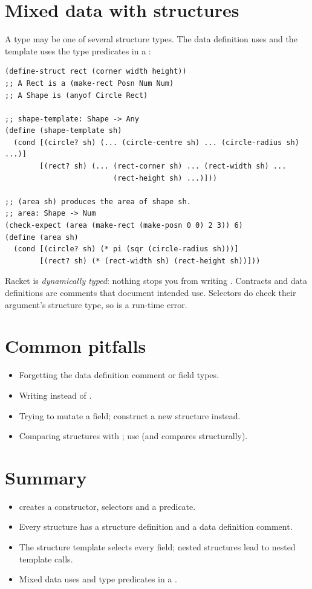 \section{Mixed data with structures}

A type may be one of several structure types. The data definition uses
 and the template uses the type predicates in a :

\begin{lstlisting}[style=racket]
(define-struct rect (corner width height))
;; A Rect is a (make-rect Posn Num Num)
;; A Shape is (anyof Circle Rect)

;; shape-template: Shape -> Any
(define (shape-template sh)
  (cond [(circle? sh) (... (circle-centre sh) ... (circle-radius sh) ...)]
        [(rect? sh) (... (rect-corner sh) ... (rect-width sh) ...
                         (rect-height sh) ...)]))

;; (area sh) produces the area of shape sh.
;; area: Shape -> Num
(check-expect (area (make-rect (make-posn 0 0) 2 3)) 6)
(define (area sh)
  (cond [(circle? sh) (* pi (sqr (circle-radius sh)))]
        [(rect? sh) (* (rect-width sh) (rect-height sh))]))
\end{lstlisting}

\begin{aside}
Racket is \emph{dynamically typed}: nothing stops you from writing
. Contracts and data definitions are comments that
document intended use. Selectors do check their argument's structure type,
so  is a run-time error.
\end{aside}

\section{Common pitfalls}
\begin{itemize}
  \item Forgetting the data definition comment or field types.
  \item Writing  instead of .
  \item Trying to mutate a field; construct a new structure instead.
  \item Comparing structures with \code{=}; use  (and  compares structurally).
\end{itemize}

\section{Summary}
\begin{itemize}
  \item {} creates a constructor, selectors and a predicate.
  \item Every structure has a structure definition and a data definition comment.
  \item The structure template selects every field; nested structures lead to nested template calls.
  \item Mixed data uses  and type predicates in a .
\end{itemize}
